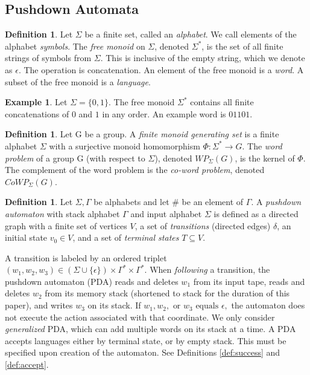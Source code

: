 \documentclass[11pt]{amsart}
\theoremstyle{plain}
\theoremstyle{remark}
\theoremstyle{definition}
\newtheorem{example}[theorem]{Example}
\newtheorem{definition}[theorem]{Definition}
\theoremstyle{remark}
\theoremstyle{named}
\begin{document}
\subsection{Pushdown Automata}
\begin{definition}
Let $\Sigma$ be a finite set, called an \emph{alphabet}. We call elements of the alphabet \emph{symbols}. The \emph{free monoid} on $\Sigma$, denoted $\Sigma^*$, is the set of all finite strings of symbols from $\Sigma$. This is inclusive of the empty string, which we denote as $\epsilon$. The operation is concatenation. An element of the free monoid is a \emph{word}. A subset of the free monoid is a \emph{language}.
\end{definition}
\begin{example}
Let $\Sigma = \{0,1\}$. The free monoid $\Sigma^*$ contains all finite concatenations of $0$ and $1$ in any order. An example word is $01101$. 
\end{example}
\begin{definition}
Let G be a group. A \emph{finite monoid generating set} is a finite alphabet $\Sigma$ with a surjective monoid homomorphism $\Phi: \Sigma^* \rightarrow G.$ 
The \emph{word problem} of a group G (with respect to $\Sigma$), denoted $WP_\Sigma(G)$, is the kernel of $\Phi$. The complement of the word problem is the \emph{co-word problem}, denoted $CoWP_\Sigma(G)$.
\end{definition}
\begin{definition}
Let $\Sigma, \Gamma$ be alphabets and let $\#$ be an element of $\Gamma$. A \emph{pushdown automaton} with stack alphabet $\Gamma$ and input alphabet $\Sigma$ is defined as a directed graph with a finite set of vertices $V$, a set of \emph{transitions} (directed edges) $\delta$, an initial state $v_0 \in V$, and a set of \emph{terminal states} $T \subseteq V$. 

\begin{figure}[b]
\end{figure}
A transition is labeled by an ordered triplet $(w_1,w_2,w_3) \in (\Sigma \cup \{\epsilon \}) \times \Gamma^* \times \Gamma^*$. When \emph{following} a transition, the pushdown automaton (PDA) reads and deletes $w_1$ from its input tape, reads and deletes $w_2$ from its memory stack (shortened to stack for the duration of this paper), and writes $w_3$ on its stack. If $w_1, w_2, \text{ or } w_3 \text{ equals } \epsilon,$ the automaton does not execute the action associated with that coordinate. 
We only consider \emph{generalized} PDA, which can add multiple words on its stack at a time.
A PDA accepts languages either by terminal state, or by empty stack. This must be specified upon creation of the automaton. See Definitions \ref{def:success} and \ref{def:accept}.
\end{definition}
\end{document}
